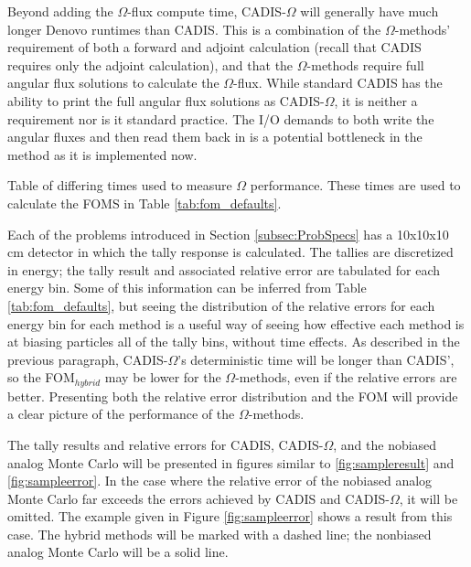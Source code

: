 Beyond
adding the $\Omega$-flux compute time, CADIS-$\Omega$ will generally have much
longer Denovo runtimes than CADIS. This is a combination of the $\Omega$-methods'
requirement of both a forward and adjoint calculation (recall that CADIS
requires only the adjoint calculation), and that the $\Omega$-methods require
full angular flux solutions to calculate the $\Omega$-flux. While standard CADIS
has the ability to print the full angular flux solutions as CADIS-$\Omega$, it
is neither a requirement nor is it standard practice. The I/O demands to both write
the angular fluxes and then read them back in is a potential bottleneck in the
method as it is implemented now.

\begin{table}[h!]
  \centering
  
  \caption[Table of differing times used to measure $\Omega$ performance.]{
    Table of differing times used to measure $\Omega$ performance. These times
    are used to calculate the FOMS in Table \ref{tab:fom_defaults}. }
  \label{tab:time_defaults}
\end{table}

Each of the problems introduced in Section \ref{subsec:ProbSpecs} has a
10x10x10 cm detector in which the tally response is calculated. The tallies are
discretized in energy; the tally result and associated relative error are
tabulated for each energy bin. Some of this information can be inferred from Table
\ref{tab:fom_defaults},
but seeing the distribution of the relative errors for each energy
bin for each method is a useful way of seeing how effective each method is at
biasing particles all of the tally bins,
without time effects. As described in the previous paragraph, CADIS-$\Omega$'s
deterministic time will be longer than CADIS', so the FOM$_{hybrid}$ may be
lower for the $\Omega$-methods, even if the relative errors are better.
Presenting both the relative error distribution and the FOM will provide a clear
picture of the performance of the $\Omega$-methods.

The tally results and relative errors for CADIS,
CADIS-$\Omega$, and the nobiased analog Monte Carlo will be
presented in figures similar to
\ref{fig:sampleresult} and \ref{fig:sampleerror}.
In the case where the
relative error of the nobiased analog Monte Carlo far exceeds the errors
achieved by CADIS and CADIS-$\Omega$, it will be omitted. The example given in
Figure \ref{fig:sampleerror} shows a result from this case. The hybrid methods
will be marked with a dashed line; the nonbiased analog Monte Carlo will be a
solid line.

